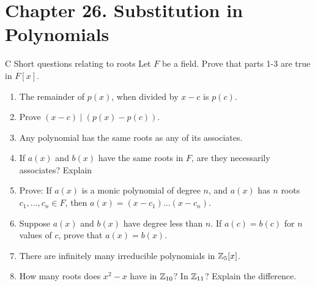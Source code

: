 \section*{Chapter 26. Substitution in Polynomials}


\begin{exercise}{C Short questions relating to roots}
Let $F$ be a field. Prove that parts 1-3 are true in $F[x]$.
\begin{enumerate}
    \item The remainder of $p(x)$, when divided by $x-c$ is $p(c)$.
    \item Prove $(x-c)\mid(p(x)-p(c))$.
    \item Any polynomial has the same roots as any of its associates.
    \item If $a(x)$ and $b(x)$ have the same roots in $F$, are they necessarily associates? Explain
    \item Prove: If $a(x)$ is a monic polynomial of degree $n$, and $a(x)$ has $n$ roots $c_1,\dots,c_n\in F$, then $a(x)=(x-c_1)\dots(x-c_n)$.
    \item Suppose $a(x)$ and $b(x)$ have degree less than $n$. If $a(c)=b(c)$ for $n$ values of $c$, prove that $a(x)=b(x)$.
    \item There are infinitely many irreducible polynomials in $\mathbb{Z}_5[x]$.
    \item How many roots does $x^2-x$ have in $\mathbb{Z}_{10}$? In $\mathbb{Z}_{11}$? Explain the difference.
\end{enumerate}
\end{exercise}
